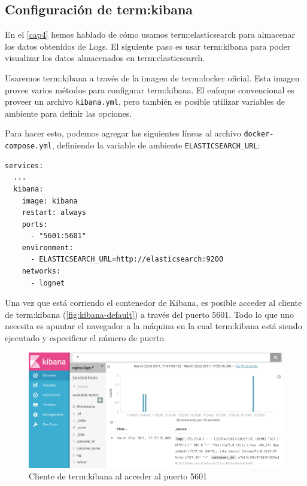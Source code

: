 \subsection{Configuración de \gls{term:kibana}}
\label{configuracion-de-kibana}

En el \autoref{cap4} hemos hablado de cómo usamos \gls{term:elasticsearch} para
almacenar los datos obtenidos de Logs. El siguiente paso es usar
\gls{term:kibana} para poder visualizar los datos almacenados en
\gls{term:elasticsearch}.

Usaremos \gls{term:kibana} a través de la imagen de \gls{term:docker} oficial.
Esta imagen provee varios métodos para configurar \gls{term:kibana}. El enfoque
convencional es proveer un archivo \lstinline{kibana.yml}, pero también es
posible utilizar variables de ambiente para definir las opciones.

Para hacer esto, podemos agregar las siguientes líneas al archivo
\texttt{docker-compose.yml}, definiendo la variable de ambiente
\lstinline{ELASTICSEARCH_URL}:

\begin{lstlisting}
services:
  ...
  kibana:
    image: kibana
    restart: always
    ports:
      - "5601:5601"
    environment:
      - ELASTICSEARCH_URL=http://elasticsearch:9200
    networks:
      - lognet
\end{lstlisting}

Una vez que está corriendo el contenedor de Kibana, es posible acceder al
cliente  de \gls{term:kibana} (\autoref{fig:kibana-default}) a
través del puerto 5601. Todo lo que uno necesita es apuntar el navegador
 a la máquina en la cual \gls{term:kibana} está siendo ejecutado y especificar el número de puerto.

\begin{figure}
  \includegraphics[width=\linewidth]{src/images/05-capitulo-5/kibanadefault.jpg}
  \caption{Cliente de \gls{term:kibana} al acceder al puerto 5601}
  \label{fig:kibana-default}
\end{figure}

